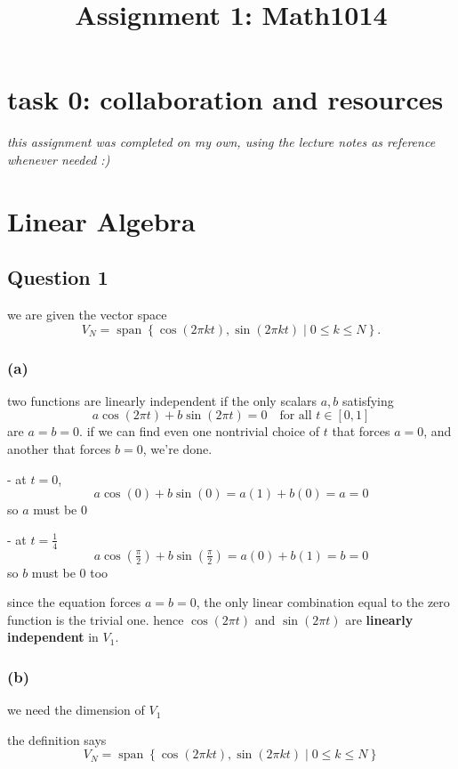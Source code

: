 \documentclass{article}
\author{}
\title{Assignment 1: Math1014}
\begin{document}
\setlength{\parindent}{0pt}
\maketitle

\section*{task 0: collaboration and resources}

\textit{this assignment was completed on my own, using the lecture notes as reference whenever needed :)}

\section{Linear Algebra}

\subsection{Question 1}
we are given the vector space
\[
V_N = \operatorname{span} \left\{\cos(2\pi kt),\sin(2\pi kt)\mid 0\leq k\leq N\right\}.
\]

\subsubsection*{(a)}
two functions are linearly independent if the only scalars $a,b$ satisfying
\[
a\cos(2\pi t) + b \sin(2\pi t) = 0 \quad \text{for all } t \in [0,1]
\]
are $a = b = 0$. if we can find even one nontrivial choice of $t$ that forces $a=0$, and another that forces $b=0$, we're done.

- at $t=0$,
\[
a\cos(0) + b\sin(0) = a(1) + b(0) = a = 0
\]
so $a$ must be $0$
 
- at $t = \frac{1}{4}$
\[
a\cos\left(\tfrac{\pi}{2}\right) + b\sin\left(\tfrac{\pi}{2}\right) = a(0) + b(1) = b = 0
\]
so $b$ must be $0$ too
 
since the equation forces $a=b=0$, the only linear combination equal to the zero function is the trivial one. 
hence $\cos(2\pi t)$ and $\sin(2\pi t)$ are \textbf{linearly independent} in $V_1$.

\subsubsection*{(b)}
we need the dimension of $V_1$

the definition says
\[
V_N= \operatorname{span} \left\{ \cos(2\pi kt),\sin(2\pi kt) \mid0\leq k\leq N \right\}
\]
\end{document}
